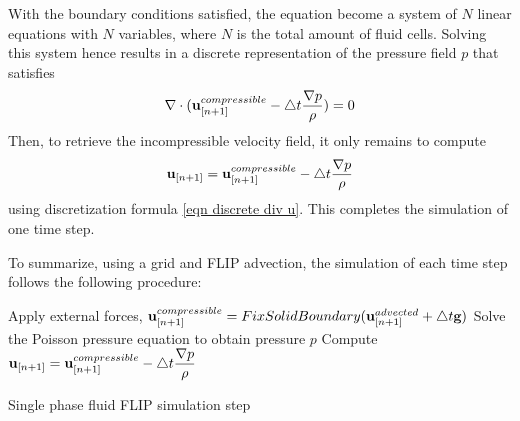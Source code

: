 With the boundary conditions satisfied, the equation become a system of $N$ linear equations with $N$ variables, where $N$ is the total amount of fluid cells. Solving this system hence results in a discrete representation of the pressure field $p$ that satisfies 
$$
\nabla \cdot
 ( \textbf{u}_{[n+1]}^{compressible} - \triangle t \frac{\nabla p}{\rho} ) = 0
$$
Then, to retrieve the incompressible velocity field, it only remains to compute
$$ \textbf{u}_{[n+1]} = \textbf{u}_{[n+1]}^{compressible} - \triangle t \frac{\nabla p}{\rho}$$
using discretization formula \ref{eqn discrete div u}. This completes the simulation of one time step.

\gapM

To summarize, using a grid and FLIP advection, the simulation of each time step follows the following procedure:

\gapM

\begin{algorithm}[H]
    \label{algo singlephase flip}

    \SetAlgoLined
    Apply external forces, $\textbf{u}_{[n+1]}^{compressible} =  FixSolidBoundary(\textbf{u}_{[n+1]}^{advected} + \triangle t \textbf{g})$\;
    Solve the Poisson pressure equation to obtain pressure $p$\;
    Compute $\textbf{u}_{[n+1]} = \textbf{u}_{[n+1]}^{compressible} - \triangle t \dfrac{\nabla p}{\rho}$

    \caption{Single phase fluid FLIP simulation step}
\end{algorithm}


